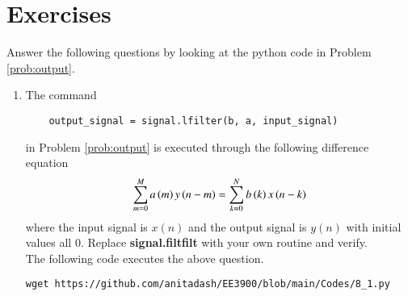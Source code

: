 \documentclass[journal,12pt,twocolumn]{IEEEtran}
\renewcommand\thesection{\arabic{section}}
\begin{document}
\section{Exercises}
Answer the following questions by looking at the python code in Problem \ref{prob:output}.
\begin{enumerate}[label=\thesection.\arabic*]
\item
The command
\begin{lstlisting}
	output_signal = signal.lfilter(b, a, input_signal)
	\end{lstlisting}
in Problem \ref{prob:output} is executed through the following difference equation
\begin{equation}
\label{eq:iir_filter_gen}
 \sum _{m=0}^{M}a\left(m\right)y\left(n-m\right)=\sum _{k=0}^{N}b\left(k\right)x\left(n-k\right)
\end{equation}
%
where the input signal is $x(n)$ and the output signal is $y(n)$ with initial values all 0. Replace
\textbf{signal.filtfilt} with your own routine and verify.\\
\solution The following code executes the above question.
\begin{lstlisting}
wget https://github.com/anitadash/EE3900/blob/main/Codes/8_1.py
\end{lstlisting}


\end{enumerate}
\end{document}
